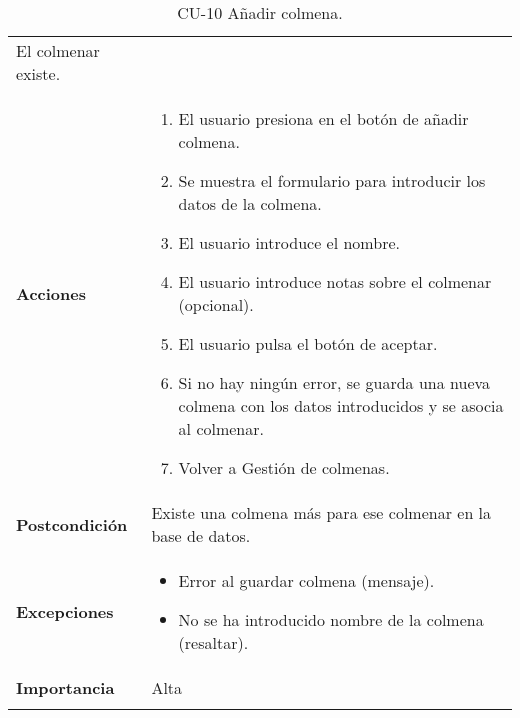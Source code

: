 \begin{longtable}[H]{@{}ll@{}}
\begin{minipage}[t]{0.75\columnwidth}
El colmenar existe.\strut
\end{minipage}\tabularnewline
\begin{minipage}[t]{0.269\columnwidth}\raggedright\strut
\textbf{Acciones}\strut
\end{minipage} & \begin{minipage}[t]{0.75\columnwidth}\raggedright\strut
\begin{enumerate}
\def\labelenumi{\arabic{enumi}.}
\tightlist
\item
  El usuario presiona en el botón de añadir colmena.
\item
  Se muestra el formulario para introducir los datos de la colmena.
\item
  El usuario introduce el nombre.
\item
  El usuario introduce notas sobre el colmenar (opcional).
\item
  El usuario pulsa el botón de aceptar.
\item
  Si no hay ningún error, se guarda una nueva colmena con los datos
  introducidos y se asocia al colmenar.
\item
  Volver a Gestión de colmenas.
\end{enumerate}\strut
\end{minipage}\tabularnewline
\begin{minipage}[t]{0.269\columnwidth}\raggedright\strut
\textbf{Postcondición}\strut
\end{minipage} & \begin{minipage}[t]{0.75\columnwidth}\raggedright\strut
Existe una colmena más para ese colmenar en la base de datos.\strut
\end{minipage}\tabularnewline
\begin{minipage}[t]{0.269\columnwidth}\raggedright\strut
\textbf{Excepciones}\strut
\end{minipage} & \begin{minipage}[t]{0.75\columnwidth}\raggedright\strut
\begin{itemize}
\tightlist
\item
  Error al guardar colmena (mensaje).
\item
  No se ha introducido nombre de la colmena (resaltar).
\end{itemize}\strut
\end{minipage}\tabularnewline
\begin{minipage}[t]{0.269\columnwidth}\raggedright\strut
\textbf{Importancia}\strut
\end{minipage} & \begin{minipage}[t]{0.75\columnwidth}\raggedright\strut
Alta\strut
\end{minipage}\tabularnewline
\bottomrule
\caption{CU-10 Añadir colmena.}
\end{longtable}

